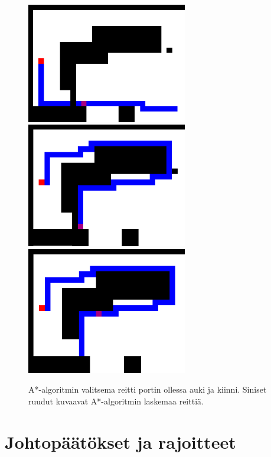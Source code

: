 \documentclass[utf8]{gradu3}
\begin{document}
\begin{figure}[h]
\includegraphics[width=7cm]{a_star_gate_collision.png}
\hspace{1 cm}
\vspace{1 cm}
\includegraphics[width=7cm]{a_star_detour.png}
\includegraphics[width=7cm]{a_star_detour_no_gate.png}
\caption{A*-algoritmin valitsema reitti portin ollessa auki ja kiinni. Siniset ruudut kuvaavat A*-algoritmin laskemaa reittiä.}
\label{astargate}
\end{figure}

\section{Johtopäätökset ja rajoitteet}
\label{johtop}
\end{document}
